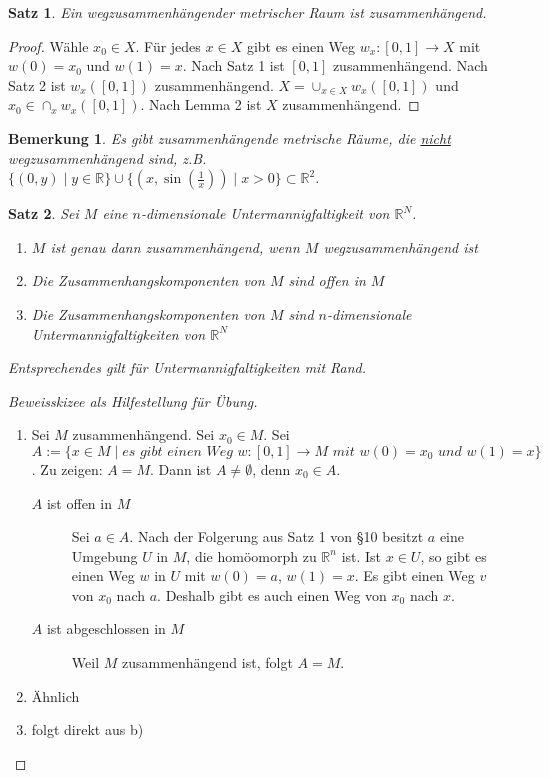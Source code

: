 \documentclass[10pt,a4paper]{report}
\newtheorem{satz}{Satz}
\newtheorem*{remark}{Bemerkung}
\begin{document}
\begin{satz}
  Ein wegzusammenhängender metrischer Raum ist zusammenhängend.
\end{satz}

\begin{proof}
  Wähle $x_{0} \in X$.
  Für jedes $x \in X$ gibt es einen Weg $w_{x} : [0, 1] \rightarrow X$ mit $w(0) = x_{0}$ und $w(1) = x$.
  Nach Satz 1 ist $[0, 1]$ zusammenhängend.
  Nach Satz 2 ist $w_{x}([0, 1])$ zusammenhängend.
  $X = \cup_{x \in X} w_{x}([0, 1])$ und $x_{0} \in \cap_{x} w_{x}([0, 1])$.
  Nach Lemma 2 ist $X$ zusammenhängend.
\end{proof}

\begin{remark}
  Es gibt zusammenhängende metrische Räume, die \underline{nicht} wegzusammenhängend sind, z.B. $\{ (0, y) \mid y \in \mathbb{R} \} \cup \{ (x, \sin(\frac{1}{x})) \mid x > 0 \} \subset \mathbb{R}^{2}$.
\end{remark}

\begin{satz}
  Sei $M$ eine $n$-dimensionale Untermannigfaltigkeit von $\mathbb{R}^{N}$.
  \begin{enumerate}[label={\alph*)}]
  \item $M$ ist genau dann zusammenhängend, wenn $M$ wegzusammenhängend ist
  \item Die Zusammenhangskomponenten von $M$ sind offen in $M$
  \item Die Zusammenhangskomponenten von $M$ sind $n$-dimensionale Untermannigfaltigkeiten von $\mathbb{R}^{N}$
  \end{enumerate}
  Entsprechendes gilt für Untermannigfaltigkeiten mit Rand.
\end{satz}

\begin{proof}[Beweisskizee als Hilfestellung für Übung]
  \begin{enumerate}[label={\alph*)}]
  \item Sei $M$ zusammenhängend.
    Sei $x_{0} \in M$.
    Sei $A := \{ x \in M \mid \textit{es gibt einen Weg $w : [0, 1] \rightarrow M$ mit $w(0) = x_0$ und $w(1) = x$} \}$.
    Zu zeigen: $A = M$.
    Dann ist $A \ne \emptyset$, denn $x_{0} \in A$.
    \begin{description}
    \item[$A$ ist offen in $M$] Sei $a \in A$.
      Nach der Folgerung aus Satz 1 von §10 besitzt $a$ eine Umgebung $U$ in $M$, die homöomorph zu $\mathbb{R}^{n}$ ist.
      Ist $x \in U$, so gibt es einen Weg $w$ in $U$ mit $w(0) = a$, $w(1) = x$.
      Es gibt einen Weg $v$ von $x_{0}$ nach $a$.
      Deshalb gibt es auch einen Weg von $x_{0}$ nach $x$.
      \item[$A$ ist abgeschlossen in $M$] Weil $M$ zusammenhängend ist, folgt $A = M$.
    \end{description}
  \item Ähnlich
  \item folgt direkt aus b)
  \end{enumerate}
\end{proof}
\end{document}

